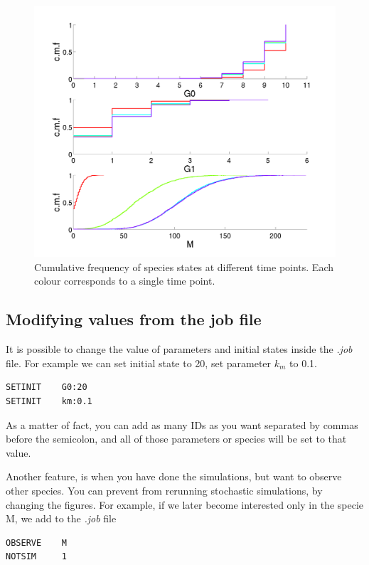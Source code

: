 \documentclass[letterpaper]{article}
\begin{document}
\begin{figure}[H]
  \centering
  \includegraphics[scale=0.3]{figures/rna1_doc1_ss.png}
  \caption{Cumulative frequency of species states at different time
    points. Each colour corresponds to a single time point.}
  \label{fig:test1dist}
\end{figure}

\subsection{Modifying values from the job file}

It is possible to change the value of parameters and initial states
inside the \emph{.job} file. For example we can set initial state to
20, set parameter $k_m$ to 0.1.
{\footnotesize
\begin{verbatim}
SETINIT    G0:20
SETINIT    km:0.1
\end{verbatim}
}
As a matter of fact, you can add as many IDs as you want separated by
commas before the semicolon, and all of those parameters or species
will be set to that value.

Another feature, is when you have done the simulations, but want to
observe other species. You can prevent from rerunning stochastic
simulations, by changing the figures. For example, if we later become
interested only in the specie M, we add to the \emph{.job} file
{\footnotesize
\begin{verbatim}
OBSERVE    M
NOTSIM     1
\end{verbatim}
}
\end{document}
